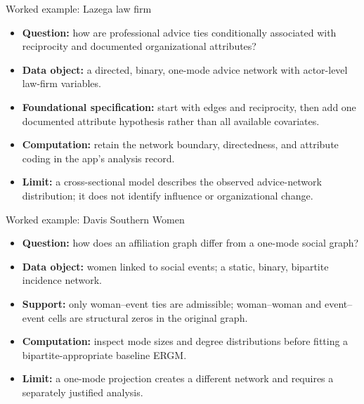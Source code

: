 \documentclass[aspectratio=169,11pt]{beamer}
\newcommand{\term}[1]{\textbf{\color{nupurple}#1}}
\begin{document}
\begin{frame}{Worked example: Lazega law firm}
\begin{itemize}
\item \term{Question:} how are professional advice ties conditionally associated with reciprocity and documented organizational attributes?
\item \term{Data object:} a directed, binary, one-mode advice network with actor-level law-firm variables.
\item \term{Foundational specification:} start with edges and reciprocity, then add one documented attribute hypothesis rather than all available covariates.
\item \term{Computation:} retain the network boundary, directedness, and attribute coding in the app's analysis record.
\item \term{Limit:} a cross-sectional model describes the observed advice-network distribution; it does not identify influence or organizational change.
\end{itemize}
\end{frame}

\begin{frame}{Worked example: Davis Southern Women}
\begin{itemize}
\item \term{Question:} how does an affiliation graph differ from a one-mode social graph?
\item \term{Data object:} women linked to social events; a static, binary, bipartite incidence network.
\item \term{Support:} only woman--event ties are admissible; woman--woman and event--event cells are structural zeros in the original graph.
\item \term{Computation:} inspect mode sizes and degree distributions before fitting a bipartite-appropriate baseline ERGM.
\item \term{Limit:} a one-mode projection creates a different network and requires a separately justified analysis.
\end{itemize}
\end{frame}
\end{document}

